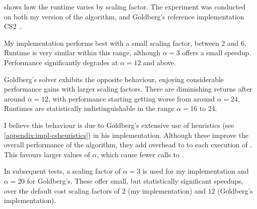  shows how the runtime varies by scaling factor. %
The experiment was conducted on both my version of the algorithm, and Goldberg's reference implementation CS2~\cite{CS2:2009}.

My implementation performs best with a small scaling factor, between $2$ and $6$. Runtime is very similar within this range, although $\alpha=3$ offers a small speedup. Performance significantly degrades at $\alpha = 12$ and above.

Goldberg's solver exhibits the opposite behaviour, enjoying considerable performance gains with larger scaling factors. There are diminishing returns after around $\alpha = 12$, with performance starting getting worse from around $\alpha = 24$. Runtimes are statistically indistinguishable in the range $\alpha=16$ to $24$.

I believe this behaviour is due to Goldberg's extensive use of heuristics (see \cref{appendix:impl-csheuristics}) in his implementation. Although these improve the overall performance of the algorithm, they add overhead to to each execution of . This favours larger values of $\alpha$, which cause fewer calls to . 

In subsequent tests, a scaling factor of $\alpha = 3$ is used for my implementation and $\alpha = 20$ for Goldberg's. These offer small, but statistically significant speedups, over the default cost scaling factors of $2$ (my implementation) and $12$ (Goldberg's implementation).

%
%
%
%

